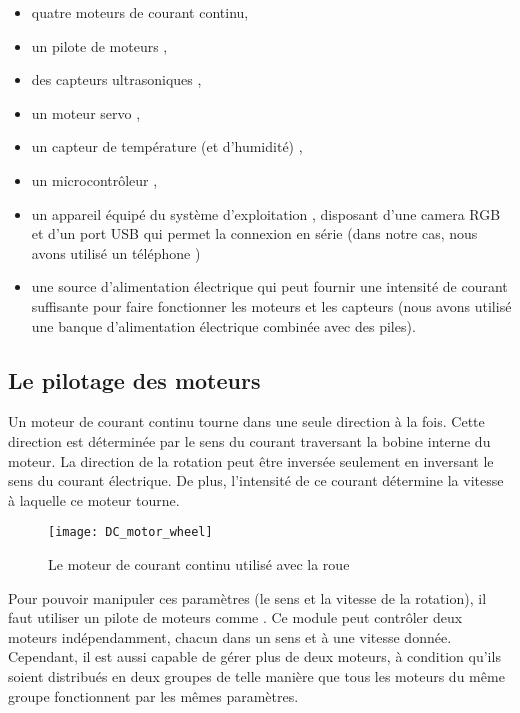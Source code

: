 \begin{itemize}
  \item quatre moteurs de courant continu,
  \item un pilote de moteurs ,
  \item des capteurs ultrasoniques ,
  \item un moteur servo ,
  \item un capteur de température (et d'humidité) ,
  \item un microcontrôleur ,
  \item un appareil équipé du système d'exploitation ,
  disposant d'une camera RGB et d'un port USB qui permet la connexion en série
  (dans notre cas, nous avons utilisé un téléphone )
  \item une source d'alimentation électrique qui peut fournir une intensité de
  courant suffisante pour faire fonctionner les moteurs et les capteurs (nous
  avons utilisé une banque d'alimentation électrique combinée avec des piles).
\end{itemize}

\subsection{Le pilotage des moteurs}

Un moteur de courant continu tourne dans une seule direction à la fois. Cette
direction est déterminée par le sens du courant traversant la bobine interne
du moteur. La direction de la rotation peut être inversée seulement en inversant
le sens du courant électrique. De plus, l'intensité de ce courant détermine la
vitesse à laquelle ce moteur tourne.

\begin{figure}[h]
\begin{center}
\texttt{[image: DC\_motor\_wheel]}
\caption{Le moteur de courant continu utilisé avec la roue}
\end{center}
\end{figure}

Pour pouvoir manipuler ces paramètres (le sens et la vitesse de la rotation), il
faut utiliser un pilote de moteurs comme . Ce module peut contrôler
deux moteurs indépendamment, chacun dans un sens et à une vitesse donnée. Cependant, il est
aussi capable de gérer plus de deux moteurs, à condition qu'ils soient distribués
en deux groupes de telle manière que tous les moteurs du même groupe fonctionnent
par les mêmes paramètres.

